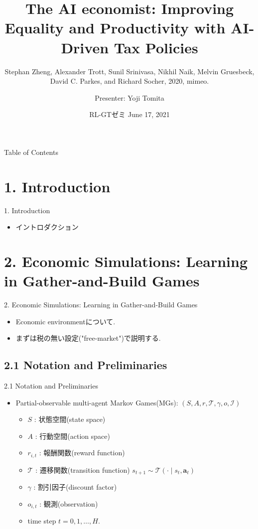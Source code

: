\documentclass[unicode,aspectratio=169,11pt]{beamer}
\title{
    The AI economist:
    Improving Equality and Productivity with AI-Driven Tax Policies
}
\subtitle{Stephan Zheng, Alexander Trott, Sunil Srinivasa, Nikhil Naik, Melvin Gruesbeck, David C. Parkes, and Richard Socher, 2020, mimeo.}
\author{Presenter: Yoji Tomita}
\date{RL-GTゼミ June 17, 2021}
\begin{document}
\maketitle

\begin{frame}{Table of Contents}
    \tableofcontents
\end{frame}

\section{1. Introduction}
\begin{frame}{1. Introduction}
    \begin{itemize}
        \item イントロダクション
    \end{itemize}
\end{frame}

\section{2. Economic Simulations: Learning in Gather-and-Build Games}

\begin{frame}{2. Economic Simulations: Learning in Gather-and-Build Games}{}
    \begin{itemize}
        \item Economic environmentについて.
        \item まずは税の無い設定("free-market")で説明する.
    \end{itemize}
\end{frame}

\subsection{2.1 Notation and Preliminaries}
\begin{frame}{2.1 Notation and Preliminaries}
    \begin{itemize}
        \item Partial-observable multi-agent Markov Games(MGs): $(S, A, r, \mathscr{T}, \gamma, o, \mathscr{I})$
        \begin{itemize}
            \item $S$ : 状態空間(state space)
            \item $A$ : 行動空間(action space)
            \item $r_{i,t}$ : 報酬関数(reward function)
            \item $\mathscr{T}$ : 遷移関数(transition function)  $s_{t+1} \sim \mathscr{T}(\cdot \mid s_t, \bm{a}_t)$
            \item $\gamma$ : 割引因子(discount factor)
            \item $o_{i,t}$ : 観測(observation)
            \item time step $t = 0, 1, \dots, H$.
        \end{itemize}
    \end{itemize}
\end{frame}
\end{document}
